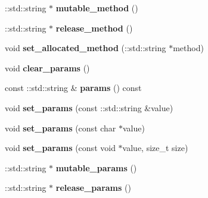 \begin{DoxyCompactItemize}
\item 
\mbox{\label{classcoappbrpc_1_1Request_a1145ab28351a4c3f8dd846ce17770730}} 
\+::std\+::string $\ast$ {\bfseries mutable\+\_\+method} ()
\item 
\mbox{\label{classcoappbrpc_1_1Request_a2394d4827b0c92238294c38424590419}} 
\+::std\+::string $\ast$ {\bfseries release\+\_\+method} ()
\item 
\mbox{\label{classcoappbrpc_1_1Request_abc69e31e8d9b71ad106e57386d14891d}} 
void {\bfseries set\+\_\+allocated\+\_\+method} (\+::std\+::string $\ast$method)
\item 
\mbox{\label{classcoappbrpc_1_1Request_a80b1ab7b95c197b7d7c7ef01d478d5c9}} 
void {\bfseries clear\+\_\+params} ()
\item 
\mbox{\label{classcoappbrpc_1_1Request_a475de4a3d35e86c91adad2b824bbd52d}} 
const \+::std\+::string \& {\bfseries params} () const
\item 
\mbox{\label{classcoappbrpc_1_1Request_a738278b90cadfe2e5452ade21fd34691}} 
void {\bfseries set\+\_\+params} (const \+::std\+::string \&value)
\item 
\mbox{\label{classcoappbrpc_1_1Request_a37741785a7e7ea8498839962a575d319}} 
void {\bfseries set\+\_\+params} (const char $\ast$value)
\item 
\mbox{\label{classcoappbrpc_1_1Request_a9fcffc4c495208606973bc8b6683248d}} 
void {\bfseries set\+\_\+params} (const void $\ast$value, size\+\_\+t size)
\item 
\mbox{\label{classcoappbrpc_1_1Request_a42c21d76e979369b8df159a1b1b03573}} 
\+::std\+::string $\ast$ {\bfseries mutable\+\_\+params} ()
\item 
\mbox{\label{classcoappbrpc_1_1Request_a2aec9643c67b70935692a3648af508aa}} 
\+::std\+::string $\ast$ {\bfseries release\+\_\+params} ()
\item 

\end{DoxyCompactItemize}
